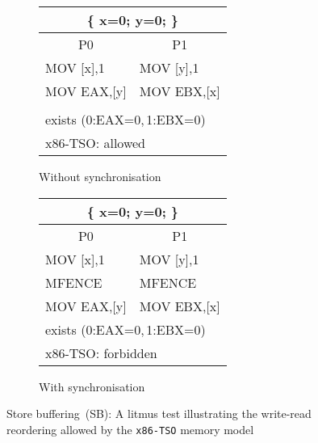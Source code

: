 \begin{figure}[t]
\centering
\ttfamily
\begin{subfigure}[b]{.4\textwidth}
\begin{tabular}[b]{ |l|l| }
\hline
\multicolumn{2}{|c|}{ \{ x=0; y=0; \}} \\ \hline
\multicolumn{1}{|c|}{P0} & \multicolumn{1}{c|}{P1} \\ \hline
MOV [x],1 & MOV [y],1 \\
MOV EAX,[y] & MOV EBX,[x] \\
& \\
\hline
\multicolumn{2}{|l|}{exists (0:EAX=0,\,1:EBX=0)} \tabularnewline
\hline
\multicolumn{2}{|l|}{x86-TSO: allowed} \tabularnewline
\hline
\end{tabular}
\caption{Without synchronisation}
\label{simple_wmm_x86:nosync}
\end{subfigure}
\hfill
%
\begin{subfigure}[b]{.4\textwidth}
\begin{tabular}{ |l|l| }
\hline
\multicolumn{2}{|c|}{ \{ x=0; y=0; \}} \\ \hline
\multicolumn{1}{|c|}{P0} & \multicolumn{1}{c|}{P1} \\ \hline
MOV [x],1 & MOV [y],1 \\
MFENCE & MFENCE \\
MOV EAX,[y] & MOV EBX,[x] \\
\hline
\multicolumn{2}{|l|}{exists (0:EAX=0,\,1:EBX=0)} \tabularnewline
\hline
\multicolumn{2}{|l|}{x86-TSO: forbidden} \tabularnewline
\hline
\end{tabular}
\caption{With synchronisation}
\label{simple_wmm_x86:sync}
\end{subfigure}
%
\caption{Store buffering~(SB): A litmus test illustrating the write-read reordering allowed by the \texttt{x86-TSO} memory model}
\label{simple_wmm_x86}
\end{figure}

